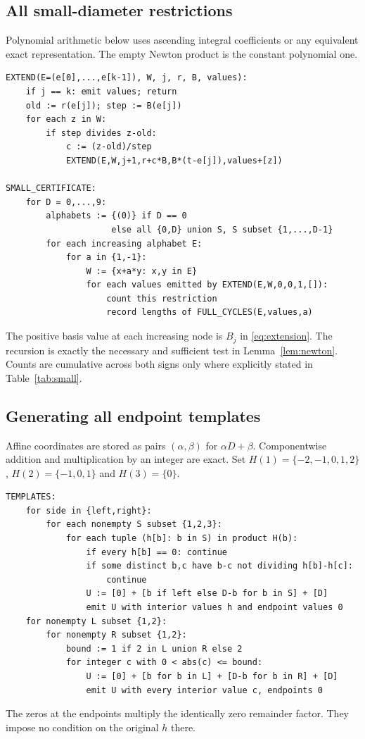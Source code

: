 \subsection{All small-diameter restrictions}
Polynomial arithmetic below uses ascending integral coefficients
or any equivalent exact representation. The empty Newton product
is the constant polynomial one.
\begin{Verbatim}[fontsize=\small]
EXTEND(E=(e[0],...,e[k-1]), W, j, r, B, values):
    if j == k: emit values; return
    old := r(e[j]); step := B(e[j])
    for each z in W:
        if step divides z-old:
            c := (z-old)/step
            EXTEND(E,W,j+1,r+c*B,B*(t-e[j]),values+[z])

SMALL_CERTIFICATE:
    for D = 0,...,9:
        alphabets := {(0)} if D == 0
                     else all {0,D} union S, S subset {1,...,D-1}
        for each increasing alphabet E:
            for a in {1,-1}:
                W := {x+a*y: x,y in E}
                for each values emitted by EXTEND(E,W,0,0,1,[]):
                    count this restriction
                    record lengths of FULL_CYCLES(E,values,a)
\end{Verbatim}
The positive basis value at each increasing node is $B_j$ in
\eqref{eq:extension}. The recursion is exactly the necessary and
sufficient test in Lemma~\ref{lem:newton}. Counts are cumulative
across both signs only where explicitly stated in Table~\ref{tab:small}.

\subsection{Generating all endpoint templates}
Affine coordinates are stored as pairs $(\alpha,\beta)$ for
$\alpha D+\beta$. Componentwise addition and multiplication by an
integer are exact. Set $H(1)=\{-2,-1,0,1,2\}$,
$H(2)=\{-1,0,1\}$ and $H(3)=\{0\}$.
\begin{Verbatim}[fontsize=\small]
TEMPLATES:
    for side in {left,right}:
        for each nonempty S subset {1,2,3}:
            for each tuple (h[b]: b in S) in product H(b):
                if every h[b] == 0: continue
                if some distinct b,c have b-c not dividing h[b]-h[c]:
                    continue
                U := [0] + [b if left else D-b for b in S] + [D]
                emit U with interior values h and endpoint values 0
    for nonempty L subset {1,2}:
        for nonempty R subset {1,2}:
            bound := 1 if 2 in L union R else 2
            for integer c with 0 < abs(c) <= bound:
                U := [0] + [b for b in L] + [D-b for b in R] + [D]
                emit U with every interior value c, endpoints 0
\end{Verbatim}
The zeros at the endpoints multiply the identically zero remainder
factor. They impose no condition on the original $h$ there.

